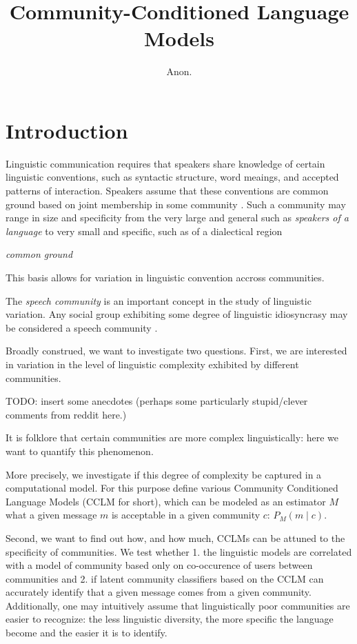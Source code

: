 \documentclass[11pt,a4paper]{article}
\title{Community-Conditioned Language Models}
\author{Anon.}
\date{}
\begin{document}
\maketitle
\begin{abstract}
\end{abstract}


\section{Introduction}

Linguistic communication requires that speakers share 
knowledge of certain linguistic conventions, such as syntactic structure, 
word meaings, and accepted patterns of interaction.
Speakers assume that these conventions are common ground based on joint membership
in some community \cite{Clark1996}.
Such a community may range in size and specificity from the very large and general
such as \emph{speakers of a language} to very small and specific, such as 
of a dialectical region 

\emph{common ground} \citep{Stalnaker2002} 

This basis allows for variation in linguistic convention accross communities.

The \emph{speech community} is an important concept 
in the study of linguistic variation.
Any social group exhibiting some degree of linguistic idiosyncrasy
may be considered a speech community \citep{Gumperz1972}.


Broadly construed, we want to investigate two questions.  First, we
are interested in variation in the level of linguistic complexity
exhibited by different communities.

TODO: insert some anecdotes (perhaps some particularly stupid/clever
comments from reddit here.)

It is folklore that certain communities are more complex
linguistically: here we want to quantify this phenomenon.

More precisely, we investigate if this degree of complexity be
captured in a computational model.  For this purpose define various
Community Conditioned Language Models (CCLM for short), which can be
modeled as an estimator $M$ what a given message $m$ is acceptable in
a given community $c$: \(P_M(m \mid c)\).

Second, we want to find out how, and how much, CCLMs can be attuned to
the specificity of communities. We test whether 1. the linguistic
models are correlated with a model of community based only on
co-occurence of users between communities and 2. if latent community
classifiers based on the CCLM can accurately identify that a given
message comes from a given community. Additionally, one may
intuitively assume that linguistically poor communities are easier to
recognize: the less linguistic diversity, the more specific the
language become and the easier it is to identify.
\end{document}
